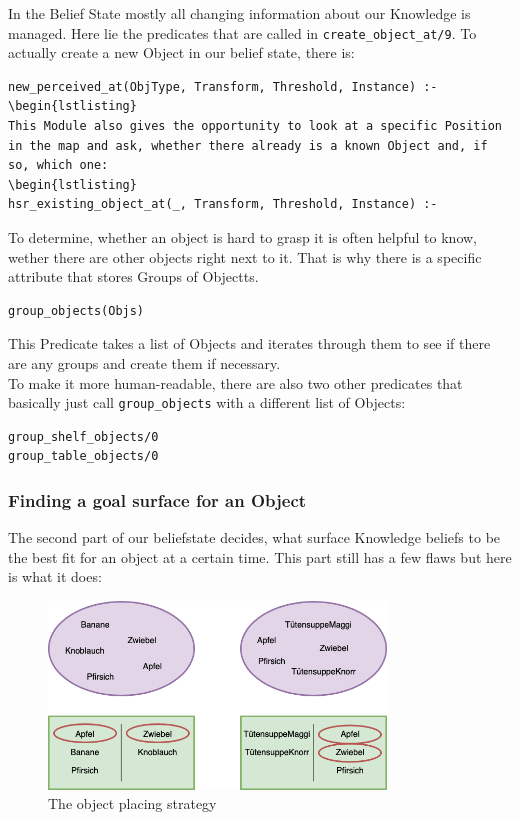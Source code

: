 \documentclass[main.tex]{subfiles}
\begin{document}
In the Belief State mostly all changing information about our Knowledge is managed. Here lie the predicates that are called in \texttt{create\_object\_at/9}. To actually create a new Object in our belief state, there is:
\begin{lstlisting}
new_perceived_at(ObjType, Transform, Threshold, Instance) :-
\begin{lstlisting}
This Module also gives the opportunity to look at a specific Position in the map and ask, whether there already is a known Object and, if so, which one:
\begin{lstlisting}
hsr_existing_object_at(_, Transform, Threshold, Instance) :-
\end{lstlisting}
To determine, whether an object is hard to grasp it is often helpful to know, wether there are other objects right next to it. That is why there is a specific attribute that stores Groups of Objectts. 
\begin{lstlisting}
group_objects(Objs)
\end{lstlisting}
This Predicate takes a list of Objects and iterates through them to see if there are any groups and create them if necessary.\\
To make it more human-readable, there are also two other predicates that basically just call \texttt{group\_objects} with a different list of Objects:
\begin{lstlisting}
group_shelf_objects/0
group_table_objects/0
\end{lstlisting}

\subsubsection{Finding a goal surface for an Object\label{sec:kn_find_surf}}

The second part of our beliefstate decides, what surface Knowledge beliefs to be the best fit for an object at a certain time. This part still has a few flaws but here is what it does:
\begin{figure}
\centering
\includegraphics[width=0.8\textwidth]{pictures/knowledge/knowledge_placing_objects}
\caption{The object placing strategy}
\label{fig:kn_obj_placement}
\end{figure}
\end{document}
